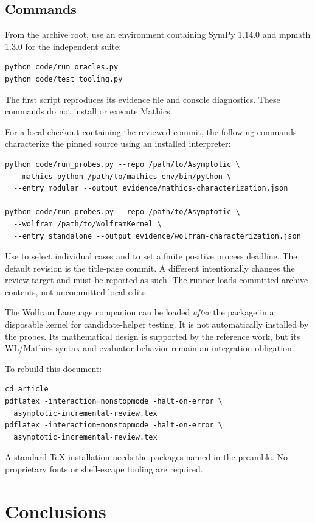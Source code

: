 \documentclass[11pt,a4paper]{article}
\newcommand{\code}[1]{\texttt{\detokenize{#1}}}
\theoremstyle{remark}
\begin{document}
\subsection{Commands}

From the archive root, use an environment containing SymPy 1.14.0 and mpmath 1.3.0 for the independent suite:
\begin{lstlisting}
python code/run_oracles.py
python code/test_tooling.py
\end{lstlisting}
The first script reproduces its evidence file and console diagnostics. These commands do not install or execute Mathics.

For a local checkout containing the reviewed commit, the following commands characterize the pinned source using an installed interpreter:
\begin{lstlisting}
python code/run_probes.py --repo /path/to/Asymptotic \
  --mathics-python /path/to/mathics-env/bin/python \
  --entry modular --output evidence/mathics-characterization.json

python code/run_probes.py --repo /path/to/Asymptotic \
  --wolfram /path/to/WolframKernel \
  --entry standalone --output evidence/wolfram-characterization.json
\end{lstlisting}
Use \code{--case} to select individual cases and \code{--timeout} to set a finite positive process deadline. The default revision is the title-page commit. A different \code{--commit} intentionally changes the review target and must be reported as such. The runner loads committed archive contents, not uncommitted local edits.

The Wolfram Language companion can be loaded \emph{after} the package in a disposable kernel for candidate-helper testing. It is not automatically installed by the probes. Its mathematical design is supported by the reference work, but its WL/Mathics syntax and evaluator behavior remain an integration obligation.

To rebuild this document:
\begin{lstlisting}
cd article
pdflatex -interaction=nonstopmode -halt-on-error \
  asymptotic-incremental-review.tex
pdflatex -interaction=nonstopmode -halt-on-error \
  asymptotic-incremental-review.tex
\end{lstlisting}
A standard TeX installation needs the packages named in the preamble. No proprietary fonts or shell-escape tooling are required.

\section{Conclusions}
\end{document}
